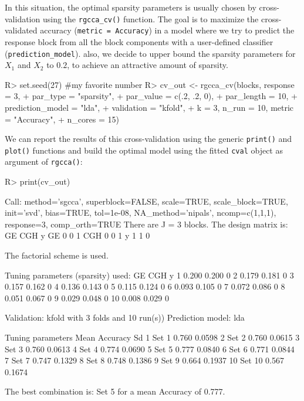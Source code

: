 \documentclass[
]{jss}
\begin{document}
In this situation, the optimal sparsity parameters is usually chosen by
cross-validation using the \texttt{rgcca\_cv()} function. The goal is to
maximize the cross-validated accuracy (\texttt{metric\ =\ Accuracy}) in
a model where we try to predict the response block from all the block
components with a user-defined classifier (\texttt{prediction\_model}).
also, we decide to upper bound the sparsity parameters for \(X_1\) and
\(X_2\) to \(0.2\), to achieve an attractive amount of sparsity.

\footnotesize

\begin{CodeChunk}
\begin{CodeInput}
R> set.seed(27) #my favorite number
R> cv_out <- rgcca_cv(blocks, response = 3, 
+                    par_type = "sparsity",
+                    par_value = c(.2, .2, 0), 
+                    par_length = 10, 
+                    prediction_model = "lda",
+                    validation = "kfold",
+                    k = 3, n_run = 10, metric = "Accuracy",
+                    n_cores = 15)
\end{CodeInput}
\end{CodeChunk}

\normalsize

We can report the results of this cross-validation using the generic
\texttt{print()} and \texttt{plot()} functions and build the optimal
model using the fitted \texttt{cval} object as argument of
\texttt{rgcca()}:

\footnotesize

\begin{CodeChunk}
\begin{CodeInput}
R> print(cv_out)
\end{CodeInput}
\begin{CodeOutput}
Call: method='sgcca', superblock=FALSE, scale=TRUE, scale_block=TRUE, init='svd',
bias=TRUE, tol=1e-08, NA_method='nipals', ncomp=c(1,1,1), response=3,
comp_orth=TRUE 
There are J = 3 blocks.
The design matrix is:
    GE CGH y
GE   0   0 1
CGH  0   0 1
y    1   1 0

The factorial scheme is used.

Tuning parameters (sparsity) used: 
      GE   CGH y
1  0.200 0.200 0
2  0.179 0.181 0
3  0.157 0.162 0
4  0.136 0.143 0
5  0.115 0.124 0
6  0.093 0.105 0
7  0.072 0.086 0
8  0.051 0.067 0
9  0.029 0.048 0
10 0.008 0.029 0

Validation: kfold with 3 folds and 10 run(s)) 
Prediction model: lda 

   Tuning parameters Mean Accuracy     Sd
1              Set 1         0.760 0.0598
2              Set 2         0.760 0.0615
3              Set 3         0.760 0.0613
4              Set 4         0.774 0.0690
5              Set 5         0.777 0.0840
6              Set 6         0.771 0.0844
7              Set 7         0.747 0.1329
8              Set 8         0.748 0.1386
9              Set 9         0.664 0.1937
10            Set 10         0.567 0.1674

The best combination is: Set 5 for a mean Accuracy of 0.777.
\end{CodeOutput}
\end{CodeChunk}
\end{document}
